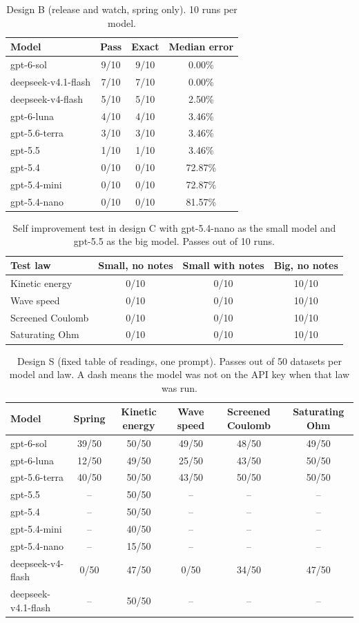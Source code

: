 \begin{table}[h]
\centering
\small
\begin{tabular}{lccc}
\hline
Model & Pass & Exact & Median error \\
\hline
gpt-6-sol & 9/10 & 9/10 & 0.00\% \\
deepseek-v4.1-flash & 7/10 & 7/10 & 0.00\% \\
deepseek-v4-flash & 5/10 & 5/10 & 2.50\% \\
gpt-6-luna & 4/10 & 4/10 & 3.46\% \\
gpt-5.6-terra & 3/10 & 3/10 & 3.46\% \\
gpt-5.5 & 1/10 & 1/10 & 3.46\% \\
gpt-5.4 & 0/10 & 0/10 & 72.87\% \\
gpt-5.4-mini & 0/10 & 0/10 & 72.87\% \\
gpt-5.4-nano & 0/10 & 0/10 & 81.57\% \\
\hline
\end{tabular}
\caption{Design B (release and watch, spring only). 10 runs per model.}
\label{tab:designB}
\end{table}
\begin{table}[h]
\centering
\small
\begin{tabular}{lccc}
\hline
Test law & Small, no notes & Small with notes & Big, no notes \\
\hline
Kinetic energy & 0/10 & 0/10 & 10/10 \\
Wave speed & 0/10 & 0/10 & 10/10 \\
Screened Coulomb & 0/10 & 0/10 & 10/10 \\
Saturating Ohm & 0/10 & 0/10 & 10/10 \\
\hline
\end{tabular}
\caption{Self improvement test in design C with gpt-5.4-nano as the small model and gpt-5.5 as the big model. Passes out of 10 runs.}
\label{tab:rsi}
\end{table}
\begin{table}[h]
\centering
\small
\begin{tabular}{lccccc}
\hline
Model & Spring & Kinetic energy & Wave speed & Screened Coulomb & Saturating Ohm \\
\hline
gpt-6-sol & 39/50 & 50/50 & 49/50 & 48/50 & 49/50 \\
gpt-6-luna & 12/50 & 49/50 & 25/50 & 43/50 & 50/50 \\
gpt-5.6-terra & 40/50 & 50/50 & 43/50 & 50/50 & 50/50 \\
gpt-5.5 & -- & 50/50 & -- & -- & -- \\
gpt-5.4 & -- & 50/50 & -- & -- & -- \\
gpt-5.4-mini & -- & 40/50 & -- & -- & -- \\
gpt-5.4-nano & -- & 15/50 & -- & -- & -- \\
deepseek-v4-flash & 0/50 & 47/50 & 0/50 & 34/50 & 47/50 \\
deepseek-v4.1-flash & -- & 50/50 & -- & -- & -- \\
\hline
\end{tabular}
\caption{Design S (fixed table of readings, one prompt). Passes out of 50 datasets per model and law. A dash means the model was not on the API key when that law was run.}
\label{tab:designS}
\end{table}
